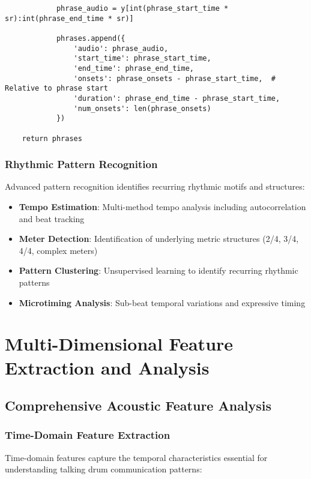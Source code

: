 \documentclass[12pt]{article}
\begin{document}
\begin{verbatim}
            phrase_audio = y[int(phrase_start_time * sr):int(phrase_end_time * sr)]
            
            phrases.append({
                'audio': phrase_audio,
                'start_time': phrase_start_time,
                'end_time': phrase_end_time,
                'onsets': phrase_onsets - phrase_start_time,  # Relative to phrase start
                'duration': phrase_end_time - phrase_start_time,
                'num_onsets': len(phrase_onsets)
            })
    
    return phrases
\end{verbatim}

\subsubsection{Rhythmic Pattern Recognition}
Advanced pattern recognition identifies recurring rhythmic motifs and structures:

\begin{itemize}
    \item \textbf{Tempo Estimation}: Multi-method tempo analysis including autocorrelation and beat tracking
    \item \textbf{Meter Detection}: Identification of underlying metric structures (2/4, 3/4, 4/4, complex meters)
    \item \textbf{Pattern Clustering}: Unsupervised learning to identify recurring rhythmic patterns
    \item \textbf{Microtiming Analysis}: Sub-beat temporal variations and expressive timing
\end{itemize}

\section{Multi-Dimensional Feature Extraction and Analysis}

\subsection{Comprehensive Acoustic Feature Analysis}

\subsubsection{Time-Domain Feature Extraction}
Time-domain features capture the temporal characteristics essential for understanding talking drum communication patterns:
\end{document}
